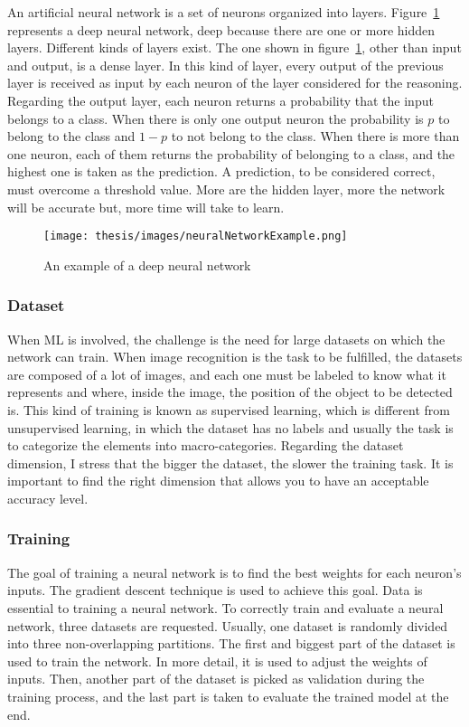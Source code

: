 \documentclass[../thesis.tex]{subfiles}
\begin{document}
An artificial neural network is a set of neurons organized into layers.  Figure~\ref{fig:neural_network_example} represents a deep neural network, deep because there are one or more hidden layers. Different kinds of layers exist. The one shown in figure~\ref{fig:neural_network_example}, other than input and output, is a dense layer. In this kind of layer, every output of the previous layer is received as input by each neuron of the layer considered for the reasoning. Regarding the output layer, each neuron returns a probability that the input belongs to a class. When there is only one output neuron the probability is $p$ to belong to the class and $1-p$ to not belong to the class. When there is more than one neuron, each of them returns the probability of belonging to a class, and the highest one is taken as the prediction. A prediction, to be considered correct, must overcome a threshold value. More are the hidden layer, more the network will be accurate but, more time will take to learn. 

\begin{figure}[H]
    \centering
    \texttt{[image: thesis/images/neuralNetworkExample.png]}
    \caption{An example of a deep neural network}
    \label{fig:neural_network_example}
\end{figure}

\subsubsection{Dataset}
When \acrshort{ML} is involved, the challenge is the need for large datasets on which the network can train. When image recognition is the task to be fulfilled, the datasets are composed of a lot of images, and each one must be labeled to know what it represents and where, inside the image, the position of the object to be detected is. This kind of training is known as supervised learning, which is different from unsupervised learning, in which the dataset has no labels and usually the task is to categorize the elements into macro-categories. Regarding the dataset dimension, I stress that the bigger the dataset, the slower the training task. It is important to find the right dimension that allows you to have an acceptable accuracy level. 

\subsubsection{Training}
The goal of training a neural network is to find the best weights for each neuron’s inputs. The gradient descent technique is used to achieve this goal. Data is essential to training a neural network. To correctly train and evaluate a neural network, three datasets are requested. Usually, one dataset is randomly divided into three non-overlapping partitions. The first and biggest part of the dataset is used to train the network. In more detail, it is used to adjust the weights of inputs. Then, another part of the dataset is picked as validation during the training process, and the last part is taken to evaluate the trained model at the end.
\end{document}
